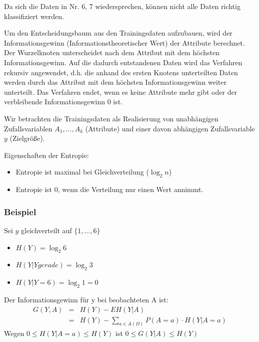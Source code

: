 Da sich die Daten in Nr. 6, 7 wiedersprechen, können nicht alle Daten richtig klassifiziert werden.

Um den Entscheidungsbaum aus den Trainingsdaten aufzubauen, wird der Informationsgewinn (Informationstheoretischer Wert) der Attribute berechnet.
Der Wurzelknoten unterscheidet nach dem Attribut mit dem höchsten Informationsgewinn.
Auf die dadurch entstandenen Daten wird das Verfahren rekursiv angewendet, d.h. die anhand des ersten Knotens unterteilten Daten werden durch das Attribut mit dem höchsten Informationsgewinn weiter unterteilt.
Das Verfahren endet, wenn es keine Attribute mehr gibt oder der verbleibende Informationsgewinn 0 ist.

Wir betrachten die Trainingsdaten als Realisierung von unabhängigen Zufallsvariablen \(A_1,\dots, A_k\) (Attribute) und einer davon abhängigen Zufallsvariable \(y\) (Zielgröße).

Eigenschaften der Entropie:
\begin{itemize}
	\item Entropie ist maximal bei Gleichverteilung (\(\log_2 n\))
	\item Entropie ist 0, wenn die Verteilung nur einen Wert annimmt.
\end{itemize}
\subsubsection{Beispiel}
Sei \(y\) gleichverteilt auf \(\{1, \ldots, 6\}\)
\begin{itemize}
	\item \(H(Y) = \log_2 6\)
	\item \(H(Y|Y gerade) = \log_2 3\)
	\item \(H(Y|Y=6) = \log_2 1 = 0\)
\end{itemize}
Der Informationsgewinn für y bei beobachteten A ist:
\begin{eqnarray*}
 G(Y,A) &=& H(Y) - E H(Y|A)\\
		&=& H(Y) - \sum\limits_{a \in A(\Omega)} P(A=a) \cdot H(Y|A=a)
\end{eqnarray*}
Wegen \(0 \leq H(Y|A=a) \leq H(Y)\) ist \(0 \leq G(Y|A) \leq H(Y)\)

\newpage
